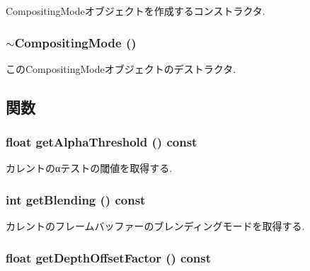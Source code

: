 CompositingModeオブジェクトを作成するコンストラクタ. \hypertarget{classm3g_1_1CompositingMode_0bba5b15be7249e946c9aaf94631ce3b}{
\subsubsection[{$\sim$CompositingMode}]{\setlength{\rightskip}{0pt plus 5cm}$\sim${\bf CompositingMode} ()}}
\label{classm3g_1_1CompositingMode_0bba5b15be7249e946c9aaf94631ce3b}


このCompositingModeオブジェクトのデストラクタ. 

\subsection{関数}
\hypertarget{classm3g_1_1CompositingMode_19ab71363ea77fa86aa6fafce87f06cb}{
\subsubsection[{getAlphaThreshold}]{\setlength{\rightskip}{0pt plus 5cm}float getAlphaThreshold () const}}
\label{classm3g_1_1CompositingMode_19ab71363ea77fa86aa6fafce87f06cb}


カレントのαテストの閾値を取得する. \hypertarget{classm3g_1_1CompositingMode_078954de3d786bd11dc98b06f237bbbb}{
\subsubsection[{getBlending}]{\setlength{\rightskip}{0pt plus 5cm}int getBlending () const}}
\label{classm3g_1_1CompositingMode_078954de3d786bd11dc98b06f237bbbb}


カレントのフレームバッファーのブレンディングモードを取得する. \hypertarget{classm3g_1_1CompositingMode_d24a4116e72678164f31d7a48f74be6b}{
\subsubsection[{getDepthOffsetFactor}]{\setlength{\rightskip}{0pt plus 5cm}float getDepthOffsetFactor () const}}
\label{classm3g_1_1CompositingMode_d24a4116e72678164f31d7a48f74be6b}


